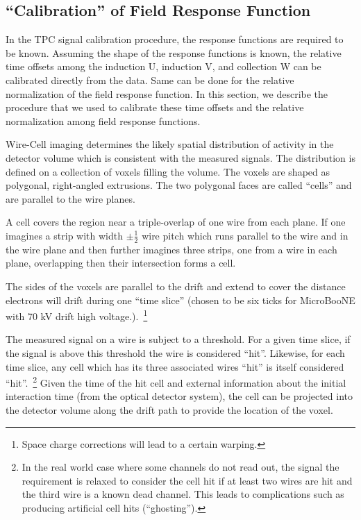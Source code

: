 \subsection{``Calibration'' of Field Response Function}

In the TPC signal calibration procedure, the response functions are required to be known. 
Assuming the shape of the response functions is known, the relative time 
offsets among the induction U, induction V, and collection W can be calibrated directly 
from the data. Same can be done for the relative normalization 
of the field response function. In this section, we describe the procedure 
that we used to calibrate these time offsets and the relative normalization among field response
functions. 

Wire-Cell imaging determines the likely spatial distribution of
activity in the detector volume which is consistent with the measured
signals.  The distribution is defined on a collection of voxels
filling the volume.  The voxels are shaped as polygonal, right-angled
extrusions.  The two polygonal faces are called ``cells'' and are
parallel to the wire planes.

A cell covers the region near a triple-overlap of one wire from each
plane.  If one imagines a strip with width $\pm\frac{1}{2}$ wire pitch
which runs parallel to the wire and in the wire plane and then further
imagines three strips, one from a wire in each plane, overlapping then
their intersection forms a cell.

The sides of the voxels are parallel to the drift and extend to cover
the distance electrons will drift during one ``time slice'' (chosen to be six
ticks for MicroBooNE with 70 kV drift high voltage.).~\footnote{Space charge 
corrections will lead to a certain warping.}

The measured signal on a wire is subject to a threshold.  For a given
time slice, if the signal is above this threshold the wire is
considered ``hit''.  Likewise, for each time slice, any cell which has
its three associated wires ``hit'' is itself considered
``hit''.~\footnote{In the real world case where some channels do not
  read out, the signal the requirement is relaxed to consider the cell
  hit if at least two wires are hit and the third wire is a known dead 
channel.  This leads to complications such
  as producing artificial cell hits (``ghosting'').}  Given the time
of the hit cell and external information about the initial interaction
time (from the optical detector system), the cell can be projected
into the detector volume along the drift path to provide the location
of the voxel.

